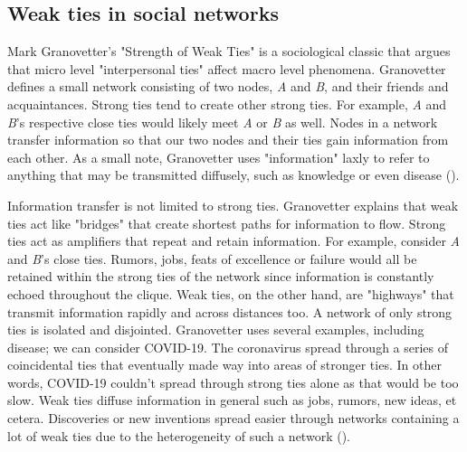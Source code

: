 \documentclass[12pt, a4paper]{article}
\begin{document}
\subsection{Weak ties in social networks}
Mark Granovetter's "Strength of Weak Ties" is a sociological classic that argues that micro level "interpersonal ties" affect macro level phenomena. Granovetter defines a small network consisting of two nodes, \textit{A} and \textit{B}, and their friends and acquaintances. Strong ties tend to create other strong ties. For example, \textit{A} and \textit{B}'s respective close ties would likely meet \textit{A} or \textit{B} as well. Nodes in a network transfer information so that our two nodes and their ties gain information from each other. As a small note, Granovetter uses "information" laxly to refer to anything that may be transmitted diffusely, such as knowledge or even disease (\cite{granovetter1973}).

Information transfer is not limited to strong ties. Granovetter explains that weak ties act like "bridges" that create shortest paths for information to flow. Strong ties act as amplifiers that repeat and retain information. For example, consider \textit{A} and \textit{B}'s close ties. Rumors, jobs, feats of excellence or failure would all be retained within the strong ties of the network since information is constantly echoed throughout the clique. Weak ties, on the other hand, are "highways" that transmit information rapidly and across distances too. A network of only strong ties is isolated and disjointed. Granovetter uses several examples, including disease; we can consider COVID-19. The coronavirus spread through a series of coincidental ties that eventually made way into areas of stronger ties. In other words, COVID-19 couldn't spread through strong ties alone as that would be too slow. Weak ties diffuse information in general such as jobs, rumors, new ideas, et cetera. Discoveries or new inventions spread easier through networks containing a lot of weak ties due to the heterogeneity of such a network (\cite{granovetter1973}).
\end{document}
